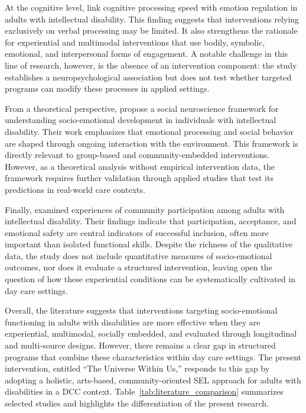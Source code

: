 \documentclass[12pt,a4paper]{article}
\begin{document}
At the cognitive level, \citet{okafor2025} link cognitive processing speed with emotion regulation in adults with intellectual disability. This finding suggests that interventions relying exclusively on verbal processing may be limited. It also strengthens the rationale for experiential and multimodal interventions that use bodily, symbolic, emotional, and interpersonal forms of engagement. A notable challenge in this line of research, however, is the absence of an intervention component: the study establishes a neuropsychological association but does not test whether targeted programs can modify these processes in applied settings.

From a theoretical perspective, \citet{sappok2022} propose a social neuroscience framework for understanding socio-emotional development in individuals with intellectual disability. Their work emphasizes that emotional processing and social behavior are shaped through ongoing interaction with the environment. This framework is directly relevant to group-based and community-embedded interventions. However, as a theoretical analysis without empirical intervention data, the framework requires further validation through applied studies that test its predictions in real-world care contexts.

Finally, \citet{parsakia2024} examined experiences of community participation among adults with intellectual disability. Their findings indicate that participation, acceptance, and emotional safety are central indicators of successful inclusion, often more important than isolated functional skills. Despite the richness of the qualitative data, the study does not include quantitative measures of socio-emotional outcomes, nor does it evaluate a structured intervention, leaving open the question of how these experiential conditions can be systematically cultivated in day care settings.

Overall, the literature suggests that interventions targeting socio-emotional functioning in adults with disabilities are more effective when they are experiential, multimodal, socially embedded, and evaluated through longitudinal and multi-source designs. However, there remains a clear gap in structured programs that combine these characteristics within day care settings. The present intervention, entitled ``The Universe Within Us,'' responds to this gap by adopting a holistic, arts-based, community-oriented SEL approach for adults with disabilities in a DCC context.
Table~\ref{tab:literature_comparison} summarizes selected studies and highlights the differentiation of the present research.
\end{document}

